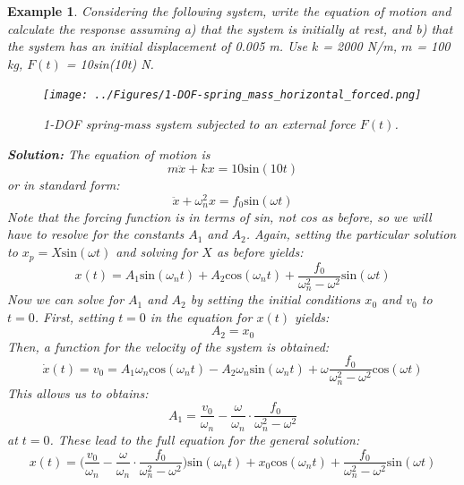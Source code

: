 \documentclass[12pt,letter]{article}
\newtheorem{ex}{Example}
\numberwithin{ex}{section} %
\newenvironment{example}{\begin{mdframed}[middlelinewidth=0.5mm]\begin{ex}\normalfont}{\end{ex}\end{mdframed}}
\numberwithin{re}{section} %
\begin{document}
\begin{example}
			Considering the following system, write the equation of motion and calculate the response assuming a) that the system is initially at rest, and b) that the system has an initial displacement of 0.005 m. Use $k$ = 2000 N/m, $m$ = 100 kg, $F(t)$ = 10sin(10t) N.
			\begin{figure}[H]
				\centering
				\texttt{[image: ../Figures/1-DOF-spring\_mass\_horizontal\_forced.png]}
				\caption{1-DOF spring-mass system subjected to an external force $F(t)$.}
			\end{figure}
			\noindent\textbf{Solution:} The equation of motion is
			\begin{equation}
				m\ddot{x}+kx=10\text{sin}(10t)
			\end{equation}
			or in standard form:
			\begin{equation}
				\ddot{x}+\omega_n^2x=f_0\text{sin}(\omega t)
			\end{equation}							
			Note that the forcing function is in terms of sin, not cos as before, so we will have to resolve for the constants $A_1$ and $A_2$. Again, setting the particular solution to $x_p=X\text{sin}(\omega t)$ and solving for $X$ as before yields:
			\begin{equation}
				x(t) = A_1\text{sin}(\omega_n t) + A_2\text{cos}(\omega_n t) + \frac{f_0}{\omega_n^2-\omega^2}\text{sin}(\omega t)
			\end{equation}	
			Now we can solve for $A_1$ and $A_2$ by setting the initial conditions $x_0$ and $v_0$ to $t=0$. First, setting $t=0$ in the equation for $x(t)$ yields:
			\begin{equation}
				A_2 = x_0
			\end{equation}	
			Then, a function for the velocity of the system is obtained: 
			\begin{equation}
				\dot{x}(t) = v_0 = A_1\omega_n\text{cos}(\omega_n t) - A_2\omega_n\text{sin}(\omega_n t) + \omega\frac{f_0}{\omega_n^2-\omega^2}\text{cos}(\omega t)
			\end{equation}				
			This allows us to obtains:
			\begin{equation}
				A_1 = \frac{v_0}{\omega_n}-\frac{\omega}{\omega_n}\cdot \frac{f_0}{\omega_n^2-\omega^2}
			\end{equation}	
			at $t=0$. These lead to the full equation for the general solution:
			\begin{equation}
				x(t) = \Big(\frac{v_0}{\omega_n}-\frac{\omega}{\omega_n}\cdot \frac{f_0}{\omega_n^2-\omega^2}\Big)\text{sin}(\omega_n t) + x_0\text{cos}(\omega_n t) + \frac{f_0}{\omega_n^2-\omega^2}\text{sin}(\omega t)

\end{equation}
\end{example}
\end{document}

